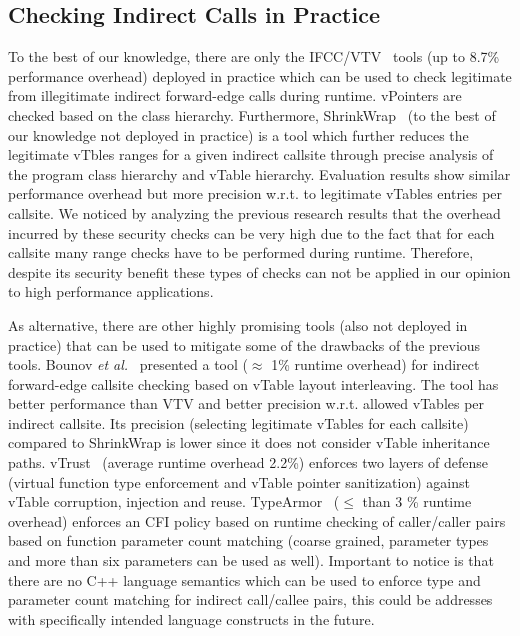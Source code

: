\subsection{Checking Indirect Calls in Practice}
\label{C++ Indirect Calls in Practice}
To the best of our knowledge, there are only the IFCC/VTV~\cite{vtv:tice} tools (up to 8.7\% performance overhead) deployed in practice
which can be used to check legitimate from illegitimate indirect forward-edge calls during runtime.
vPointers are checked based on the class hierarchy. Furthermore, ShrinkWrap~\cite{haller:shrinkwrap} (to the best of our knowledge not deployed in practice)
is a tool which further reduces the legitimate vTbles ranges for a given indirect callsite
through precise analysis of the program class hierarchy and vTable hierarchy. 
Evaluation results show similar performance overhead but more precision w.r.t. to legitimate vTables entries per callsite.
We noticed by analyzing the previous research results that the overhead incurred by
these security checks can be very high due to the fact that for each callsite many range checks 
have to be performed during runtime. Therefore, despite its security benefit these types of
checks can not be applied in our opinion to high performance applications.

As alternative, there are other highly promising tools (also not deployed in practice) that can be used to mitigate 
some of the drawbacks of the previous tools. 
Bounov \textit{et al.}~\cite{bounov:interleaving} presented a tool ($\approx$ 1\% runtime overhead)
for indirect forward-edge callsite checking based on vTable layout interleaving. The tool has better performance
than VTV and better precision w.r.t. allowed vTables per indirect callsite. Its precision (selecting legitimate vTables for each callsite)
compared to ShrinkWrap is lower since it does not consider vTable inheritance paths.
vTrust~\cite{zhang:vtrust} (average runtime overhead 2.2\%) enforces two layers of defense (virtual function type enforcement and vTable pointer sanitization)
against vTable corruption, injection and reuse.
TypeArmor~\cite{veen:typearmor} ($\le$ than 3 \% runtime overhead) enforces an CFI policy based on runtime checking of caller/caller pairs based
on function parameter count matching (coarse grained, parameter types and more than six parameters can be used as well).
Important to notice is that there are no C++ language semantics which can be used to enforce type and 
parameter count matching for indirect call/callee pairs, this could be addresses with specifically intended language constructs in the future.

